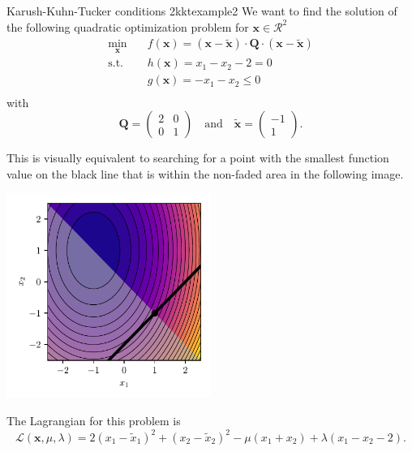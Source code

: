 \begin{example}{Karush-Kuhn-Tucker conditions 2}{kktexample2}
    We want to find the solution of the following quadratic optimization problem for $\mathbf{x} \in \mathcal{R}^2$
    \begin{equation}
        \begin{aligned}
            \min_{\mathbf{x}} \quad & f(\mathbf{x})= (\mathbf{x}-\tilde{\mathbf{x}}) \cdot \mathbf{Q} \cdot (\mathbf{x}-\tilde{\mathbf{x}})\\
            \textrm{s.t.} \quad     & h(\mathbf{x}) = x_1 - x_2 - 2 = 0  \\
                          \quad     & g(\mathbf{x}) = -x_1 - x_2 \le 0  \\
        \end{aligned}
    \end{equation}
    with 
    \begin{equation}
        \mathbf{Q} = 
        \begin{pmatrix}
        2 & 0 \\
        0 & 1 
        \end{pmatrix} 
        \quad 
        \text{and}
        \quad
        \tilde{\mathbf{x}} = 
        \begin{pmatrix}
        -1\\
        1 
        \end{pmatrix}.
    \end{equation}

    This is visually equivalent to searching for a point with the smallest function value on the black line that is within the non-faded area in the following image.
    \begin{center}
        \includegraphics[width=0.5\textwidth]{figures/kkt_example_2.pdf}
    \end{center}

    The Lagrangian for this problem is 
    \begin{equation}
        \mathcal{\mathcal{L}}(\mathbf{x}, \mu, \lambda) = 2 (x_1-\tilde{x}_1)^2 + (x_2-\tilde{x}_2)^2 - \mu (x_1+x_2) + \lambda (x_1 - x_2 -2).
    \end{equation}


\end{example}
